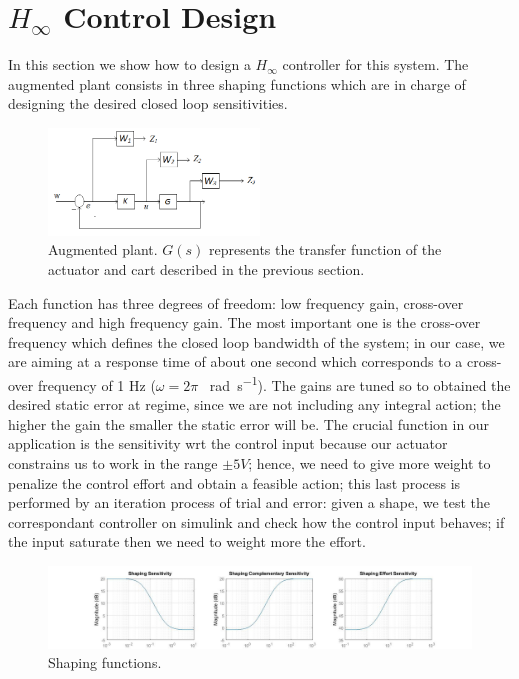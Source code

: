 \section{$H_{\infty}$ Control Design}
In this section we show how to design a $H_{\infty}$ controller for this system. The augmented plant consists in three shaping functions which are in charge of designing the desired closed loop sensitivities.\\

\begin{figure}[h]
\centering
\includegraphics[width=0.5\textwidth]{img/hinf_scheme.png}
\caption{Augmented plant. $G(s)$ represents the transfer function of the actuator and cart described in the previous section.}
\end{figure}
Each function has three degrees of freedom: low frequency gain, cross-over frequency and high frequency gain. The most important one is the cross-over frequency which defines the closed loop bandwidth of the system; in our case, we are aiming at a response time of about one second which corresponds to a cross-over frequency of 1 Hz ($\omega =2\pi $ \SI{}{\radian \per \second}). The gains are tuned so to obtained the desired static error at regime, since we are not including any integral action; the higher the gain the smaller the static error will be. The crucial function in our application is the sensitivity wrt the control input because our actuator constrains us to work in the range $\pm 5V$; hence, we need to give more weight to penalize the control effort and obtain a feasible action; this last process is performed by an iteration process of trial and error: given a shape, we test the correspondant controller on simulink and check how the control input behaves; if the input saturate then we need to weight more the effort.\\

\begin{figure}[h]
\centering
\includegraphics[width=1\textwidth]{img/hinf_shapes.jpg}
\caption{Shaping functions.}
\end{figure}

